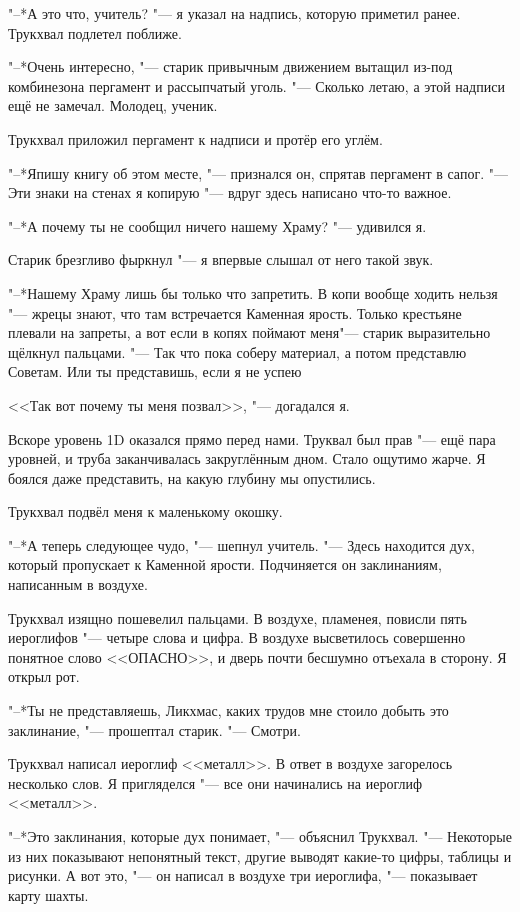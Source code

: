"--*А это что, учитель? "--- я указал на надпись, которую приметил ранее.
Трукхвал подлетел поближе.

"--*Очень интересно, "--- старик привычным движением вытащил из-под комбинезона пергамент и рассыпчатый уголь.
"--- Сколько летаю, а этой надписи ещё не замечал.
Молодец, ученик.

Трукхвал приложил пергамент к надписи и протёр его углём.

"--*Я\ldotst пишу книгу об этом месте, "--- признался он, спрятав пергамент в сапог.
"--- Эти знаки на стенах я копирую "--- вдруг здесь написано что-то важное.

"--*А почему ты не сообщил ничего нашему Храму? "--- удивился я.

Старик брезгливо фыркнул "--- я впервые слышал от него такой звук.

"--*Нашему Храму лишь бы только что запретить.
В копи вообще ходить нельзя "--- жрецы знают, что там встречается Каменная ярость.
Только крестьяне плевали на запреты, а вот если в копях поймают меня\ldotst "--- старик выразительно щёлкнул пальцами.
"--- Так что пока соберу материал, а потом представлю Советам.
Или ты представишь, если я не успею\ldotst

<<Так вот почему ты меня позвал>>, "--- догадался я.

\razd

Вскоре уровень 1D оказался прямо перед нами.
Труквал был прав "--- ещё пара уровней, и труба заканчивалась закруглённым дном.
Стало ощутимо жарче.
Я боялся даже представить, на какую глубину мы опустились.

Трукхвал подвёл меня к маленькому окошку.

"--*А теперь следующее чудо, "--- шепнул учитель.
"--- Здесь находится дух, который пропускает к Каменной ярости.
Подчиняется он заклинаниям, написанным в воздухе.

Трукхвал изящно пошевелил пальцами.
В воздухе, пламенея, повисли пять иероглифов "--- четыре слова и цифра.
В воздухе высветилось совершенно понятное слово <<ОПАСНО>>, и дверь почти бесшумно отъехала в сторону.
Я открыл рот.

"--*Ты не представляешь, Ликхмас, каких трудов мне стоило добыть это заклинание, "--- прошептал старик.
"--- Смотри.

Трукхвал написал иероглиф <<металл>>.
В ответ в воздухе загорелось несколько слов.
Я пригляделся "--- все они начинались на иероглиф <<металл>>.

"--*Это заклинания, которые дух понимает, "--- объяснил Трукхвал.
"--- Некоторые из них показывают непонятный текст, другие выводят какие-то цифры, таблицы и рисунки.
А вот это, "--- он написал в воздухе три иероглифа, "--- показывает карту шахты.

